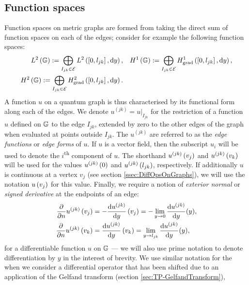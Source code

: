 \subsection{Function spaces} \label{ssec:QG-FunctionSpaces}
Function spaces on metric graphs are formed from taking the direct sum of function spaces on each of the edges; consider for example the following function spaces:
\begin{subequations} \label{eq:GraphFuncSpaces}
	\begin{align}
		L^2\left( \mathbb{G} \right) := \bigoplus_{I_{jk}\in \mathcal{E}} L^{2}\left( \left[ 0,l_{jk} \right],\mathrm{d} y \right),
		&\quad H^1\left( \mathbb{G} \right) := \bigoplus_{I_{jk}\in \mathcal{E}} H^1_\mathrm{grad}\left( \left[ 0,l_{jk} \right], \mathrm{d}y \right), \\
		H^2\left( \mathbb{G} \right) := \bigoplus_{I_{jk}\in \mathcal{E}} H^2_\mathrm{grad}\left( \left[ 0,l_{jk} \right], \mathrm{d} y \right). &
	\end{align}
\end{subequations}
A function $u$ on a quantum graph is thus characterised by its functional form along each of the edges.
We denote $u^{(jk)} = u\vert_{I_{jk}}$ for the restriction of a function $u$ defined on $\mathbb{G}$ to the edge $I_{jk}$, extended by zero to the other edges of the graph when evaluated at points outside $I_{jk}$. The $u^{(jk)}$ are referred to as the \emph{edge functions} or \emph{edge forms} of $u$.
If $u$ is a vector field, then the subscript $u_{i}$ will be used to denote the $i$\textsuperscript{th} component of $u$.
The shorthand $u^{(jk)}\left( v_j \right)$ and $u^{(jk)}\left( v_k \right)$ will be used for the values $u^{(jk)}\left( 0 \right)$ and $u^{(jk)}\left( l_{jk} \right)$, respectively.
If additionally $u$ is continuous at a vertex $v_j$ (see section \ref{ssec:DiffOpsOnGraphs}), we will use the notation $u\left( v_j \right)$ for this value.
Finally, we require a notion of \emph{exterior normal} or \emph{signed derivative} at the endpoints of an edge:
\begin{subequations} \label{eq:SignedDerivConvention}
	\begin{align}
		\dfrac{\partial }{\partial n}u^{(jk)}\left( v_j \right) &= -\dfrac{\mathrm{d}u^{(jk)}}{\mathrm{d}y}\left( v_j \right) = -\lim_{y\rightarrow0}\dfrac{\mathrm{d}u^{(jk)}}{\mathrm{d}y}(y), \\
		\dfrac{\partial }{\partial n}u^{(jk)}\left( v_k \right) &= \dfrac{\mathrm{d}u^{(jk)}}{\mathrm{d}y}\left( v_k \right) = \lim_{y\rightarrow l_{jk}}\dfrac{\mathrm{d}u^{(jk)}}{\mathrm{d}y}(y),
	\end{align}
\end{subequations}
for a differentiable function $u$ on $\mathbb{G}$ --- we will also use prime notation to denote differentiation by $y$ in the interest of brevity.
We use similar notation for the when we consider a differential operator that has been shifted due to an application of the Gelfand transform (section \ref{sec:TP-GelfandTransform}),
